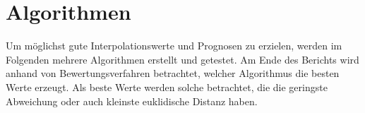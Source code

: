 
\section{Algorithmen}

Um möglichst gute Interpolationswerte und Prognosen zu erzielen, werden im Folgenden mehrere Algorithmen erstellt und getestet. Am Ende des Berichts wird anhand von Bewertungsverfahren betrachtet, welcher Algorithmus die besten Werte erzeugt. Als beste Werte werden solche betrachtet, die die geringste Abweichung oder auch kleinste euklidische Distanz haben. %